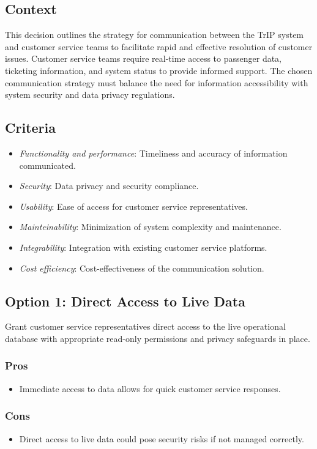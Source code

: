 \subsection*{Context}
This decision outlines the strategy for communication between the TrIP system and customer service teams to facilitate rapid and effective resolution of customer issues. Customer service teams require real-time access to passenger data, ticketing information, and system status to provide informed support. The chosen communication strategy must balance the need for information accessibility with system security and data privacy regulations.

\subsection*{Criteria}
\begin{itemize}
    \item \textit{Functionality and performance}: Timeliness and accuracy of information communicated.
    \item \textit{Security}: Data privacy and security compliance.
    \item \textit{Usability}: Ease of access for customer service representatives.
    \item \textit{Mainteinability}: Minimization of system complexity and maintenance.
    \item \textit{Integrability}: Integration with existing customer service platforms.
    \item \textit{Cost efficiency}: Cost-effectiveness of the communication solution.
\end{itemize}

\subsection*{Option 1: Direct Access to Live Data}
Grant customer service representatives direct access to the live operational database with appropriate read-only permissions and privacy safeguards in place.
\subsubsection*{Pros}
\begin{itemize}
    \item Immediate access to data allows for quick customer service responses.
\end{itemize}
\subsubsection*{Cons}
\begin{itemize}
    \item Direct access to live data could pose security risks if not managed correctly.
\end{itemize}

